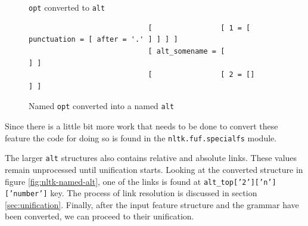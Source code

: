 \documentclass[12pt]{article}
\begin{document}
{\begin{figure}[h!]
    \centering
    {\scriptsize
     \\
    \\

    }
    \caption{\texttt{opt} converted to \texttt{alt}}
\label{fig:easy-opt}
\end{figure}

\begin{figure}[h!]
    {\scriptsize
    \begin{verbatim}
                            [                [ 1 = [ punctuation = [ after = '.' ] ] ] ]
                            [ alt_somename = [                                       ] ]
                            [                [ 2 = []                                ] ]
    \end{verbatim}
    }
    \caption{Named \texttt{opt} converted into a named \texttt{alt}}
\label{fig:named-opt}
\end{figure}

Since there is a little bit more work that needs to be done to convert these feature the code for doing so
is found in the \texttt{nltk.fuf.specialfs} module.

The larger \texttt{alt} structures also contains relative and absolute links. 
These values remain unprocessed until unification starts.
Looking at the converted structure in figure
\ref{fig:nltk-named-alt}, one of the links is found at \texttt{\small alt\_top['2']['n']['number']} key. The 
process of link resolution is discussed in section \ref{sec:unification}.
Finally, after the input feature structure and the grammar have been converted, we can proceed to their 
unification.

}
\end{document}
